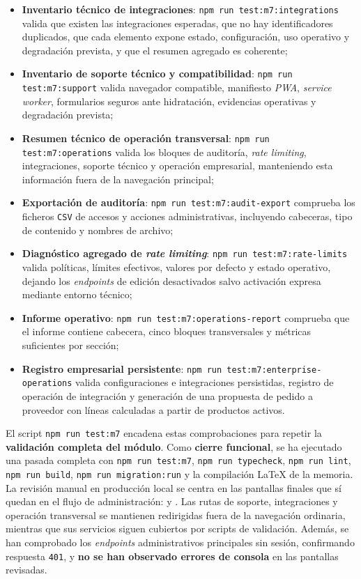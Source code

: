 \begin{itemize}
    \item \textbf{Inventario técnico de integraciones}: \texttt{npm run test:m7:integrations} valida que existen las integraciones esperadas, que no hay identificadores duplicados, que cada elemento expone estado, configuración, uso operativo y degradación prevista, y que el resumen agregado es coherente;
    \item \textbf{Inventario de soporte técnico y compatibilidad}: \texttt{npm run test:m7:support} valida navegador compatible, manifiesto \textit{PWA}, \textit{service worker}, formularios seguros ante hidratación, evidencias operativas y degradación prevista;
    \item \textbf{Resumen técnico de operación transversal}: \texttt{npm run test:m7:operations} valida los bloques de auditoría, \textit{rate limiting}, integraciones, soporte técnico y operación empresarial, manteniendo esta información fuera de la navegación principal;
    \item \textbf{Exportación de auditoría}: \texttt{npm run test:m7:audit-export} comprueba los ficheros \texttt{CSV} de accesos y acciones administrativas, incluyendo cabeceras, tipo de contenido y nombres de archivo;
    \item \textbf{Diagnóstico agregado de \textit{rate limiting}}: \texttt{npm run test:m7:rate-limits} valida políticas, límites efectivos, valores por defecto y estado operativo, dejando los \textit{endpoints} de edición desactivados salvo activación expresa mediante entorno técnico;
    \item \textbf{Informe operativo}: \texttt{npm run test:m7:operations-report} comprueba que el informe contiene cabecera, cinco bloques transversales y métricas suficientes por sección;
    \item \textbf{Registro empresarial persistente}: \texttt{npm run test:m7:enterprise-operations} valida configuraciones e integraciones persistidas, registro de operación de integración y generación de una propuesta de pedido a proveedor con líneas calculadas a partir de productos activos.
\end{itemize}

El script \texttt{npm run test:m7} encadena estas comprobaciones para repetir la \textbf{validación completa del módulo}. Como \textbf{cierre funcional}, se ha ejecutado una pasada completa con \texttt{npm run test:m7}, \texttt{npm run typecheck}, \texttt{npm run lint}, \texttt{npm run build}, \texttt{npm run migration:run} y la compilación \LaTeX{} de la memoria. La revisión manual en producción local se centra en las pantallas finales que sí quedan en el flujo de administración:  y . Las rutas de soporte, integraciones y operación transversal se mantienen redirigidas fuera de la navegación ordinaria, mientras que sus servicios siguen cubiertos por scripts de validación. Además, se han comprobado los \textit{endpoints} administrativos principales sin sesión, confirmando respuesta \texttt{401}, y \textbf{no se han observado errores de consola} en las pantallas revisadas.

